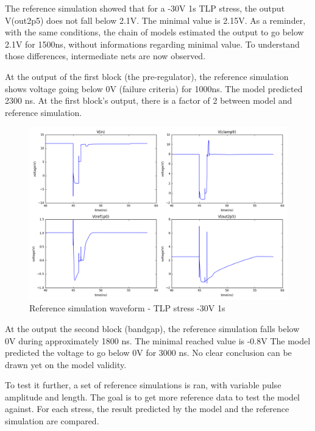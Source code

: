 The reference simulation showed that for a -30V 1\textmugreek{}s TLP stress, the output V(out2p5) does not fall below 2.1V.
The minimal value is 2.15V.
As a reminder, with the same conditions, the chain of models estimated the output to go below 2.1V for 1500ns, without informations regarding minimal value.
To understand those differences, intermediate nets are now observed.

At the output of the first block (the pre-regulator), the reference simulation shows voltage going below 0V (failure criteria) for 1000ns.
The model predicted 2300 ns.
At the first block's output, there is a factor of 2 between model and reference simulation.

\begin{figure}[!h]
  \centering
  \includegraphics[width=\textwidth]{src/4/figures/total_simulation_30V_1u.png}
  \caption{Reference simulation waveform - TLP stress -30V 1\textmugreek{}s }
  \label{fig:reference_simu}
\end{figure}

At the output the second block (bandgap), the reference simulation falls below 0V during approximately 1800 ns.
The minimal reached value is -0.8V
The model predicted the voltage to go below 0V for 3000 ns.
No clear conclusion can be drawn yet on the model validity.

To test it further, a set of reference simulations is ran, with variable pulse amplitude and length.
The goal is to get more reference data to test the model against.
For each stress, the result predicted by the model and the reference simulation are compared.

